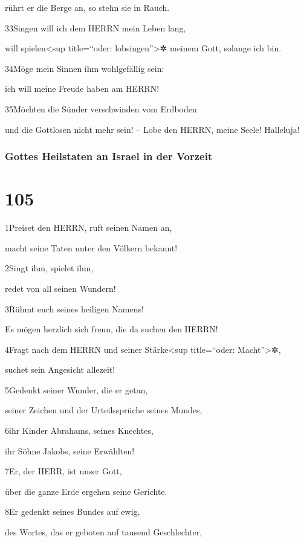 rührt er die Berge an, so stehn sie in Rauch.

33Singen will ich dem HERRN mein Leben lang,

will spielen\textless sup title=``oder: lobsingen''\textgreater✲ meinem
Gott, solange ich bin.

34Möge mein Sinnen ihm wohlgefällig sein:

ich will meine Freude haben am HERRN!

35Möchten die Sünder verschwinden vom Erdboden

und die Gottlosen nicht mehr sein! -- Lobe den HERRN, meine Seele!
Halleluja!

\hypertarget{gottes-heilstaten-an-israel-in-der-vorzeit}{%
\subsubsection{Gottes Heilstaten an Israel in der
Vorzeit}\label{gottes-heilstaten-an-israel-in-der-vorzeit}}

\hypertarget{section-104}{%
\section{105}\label{section-104}}

1Preiset den HERRN, ruft seinen Namen an,

macht seine Taten unter den Völkern bekannt!

2Singt ihm, spielet ihm,

redet von all seinen Wundern!

3Rühmt euch seines heiligen Namens!

Es mögen herzlich sich freun, die da suchen den HERRN!

4Fragt nach dem HERRN und seiner Stärke\textless sup title=``oder:
Macht''\textgreater✲,

suchet sein Angesicht allezeit!

5Gedenkt seiner Wunder, die er getan,

seiner Zeichen und der Urteilssprüche seines Mundes,

6ihr Kinder Abrahams, seines Knechtes,

ihr Söhne Jakobs, seine Erwählten!

7Er, der HERR, ist unser Gott,

über die ganze Erde ergehen seine Gerichte.

8Er gedenkt seines Bundes auf ewig,

des Wortes, das er geboten auf tausend Geschlechter,

